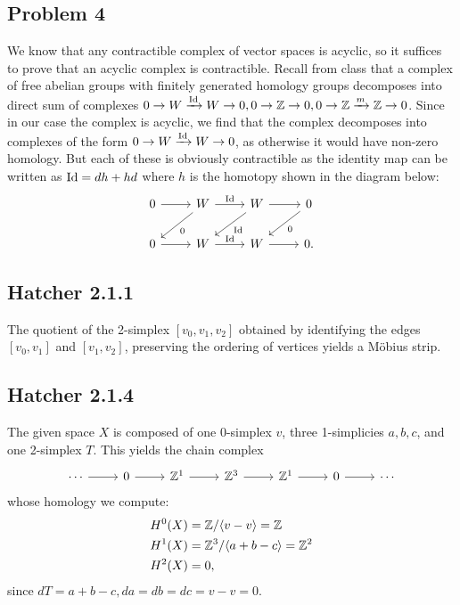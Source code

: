\documentclass{../mathnotes}
\begin{document}
\subsection*{Problem 4}
We know that any contractible complex of vector spaces is acyclic, so it suffices to prove that an
acyclic complex is contractible.
Recall from class that a complex of free abelian groups with finitely generated homology groups decomposes
into direct sum of complexes $0\to W\xrightarrow{\operatorname{Id}} W\to 0,0\to\mathbb{Z}\to0,0\to\mathbb{Z}\xrightarrow{m}\mathbb{Z}\to 0$.
Since in our case the complex is acyclic, we find that the complex decomposes into complexes of the form
$0\to W\xrightarrow{\operatorname{Id}}W\to 0$, as otherwise it would have non-zero homology. But each of these is
obviously contractible as the identity map can be written as $\operatorname{Id} = dh+hd$ where $h$ is the homotopy
shown in the diagram below:
\begin{equation*}
    \begin{tikzcd}
        0\ar{r} & W\ar{r}{\id}\ar{dl}{0} & W\ar{r}\ar{dl}{\id} & 0\ar{dl}{0}\\
        0\ar{r} & W\ar{r}{\id} & W\ar{r} & 0.
    \end{tikzcd}
\end{equation*}


\subsection*{Hatcher 2.1.1}
The quotient of the 2-simplex $[v_0,v_1,v_2]$ obtained by identifying the edges $[v_0,v_1]$ and $[v_1,v_2]$,
preserving the ordering of vertices yields a M\"obius strip.

\subsection*{Hatcher 2.1.4}
The given space $X$ is composed of one 0-simplex $v$, three 1-simplicies $a,b,c$, and one 2-simplex $T$.
This yields the chain complex
\begin{equation*}
    \begin{tikzcd}
        \cdots\ar{r} & 0\ar{r} & \Z^1\ar{r} & \Z^3\ar{r} & \Z^1\ar{r} & 0\ar{r} & \cdots
    \end{tikzcd}
\end{equation*}
whose homology we compute:
\begin{align*}
    H^0(X) &= \mathbb{Z}/\langle v-v \rangle=\mathbb{Z}\\
    H^1(X) &= \mathbb{Z}^3/\langle a+b-c\rangle =\mathbb{Z}^2\\
    H^2(X) &= 0,
\end{align*}
since $dT=a+b-c,da=db=dc=v-v=0$.
\end{document}
